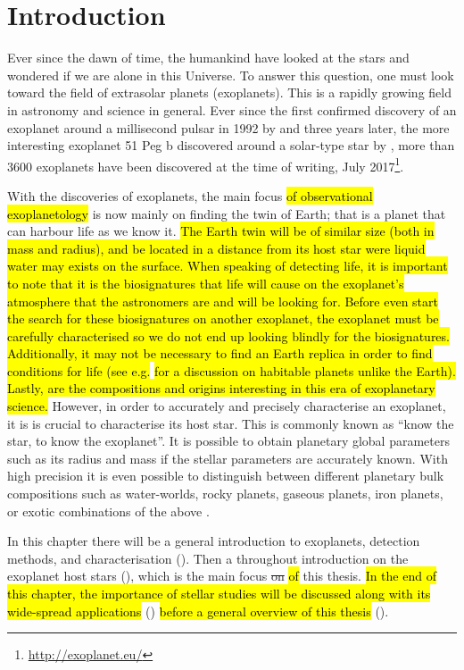 \chapter{Introduction}
\label{cha:introduction}

Ever since the dawn of time, the humankind have looked at the stars and wondered if we are alone in
this Universe. To answer this question, one must look toward the field of extrasolar planets
(exoplanets). This is a rapidly growing field in astronomy and science in general. Ever since the
first confirmed discovery of an exoplanet around a millisecond pulsar in 1992 by
\citet{Wolszczan1992} and three years later, the more interesting exoplanet 51 Peg b discovered
around a solar-type star by \citet{Mayor1995}, more than 3600 exoplanets have been discovered at the
time of writing, July 2017\footnote{\url{http://exoplanet.eu/}}.

With the discoveries of exoplanets, the main focus \hl{of observational exoplanetology} is now
mainly on finding the twin of Earth; that is a planet that can harbour life as we know it. \hl{The
Earth twin will be of similar size (both in mass and radius), and be located in a distance from its
host star were liquid water may exists on the surface. When speaking of detecting life, it is
important to note that it is the biosignatures that life will cause on the exoplanet's atmosphere
that the astronomers are and will be looking for. Before even start the search for these
biosignatures on another exoplanet, the exoplanet must be carefully characterised so we do not end
up looking blindly for the biosignatures. Additionally, it may not be necessary to find an Earth
replica in order to find conditions for life (see e.g.} \citet{Alibert2014} \hl{for a discussion on
habitable planets unlike the Earth). Lastly, are the compositions and origins interesting in this
era of exoplanetary science.} However, in order to accurately and precisely characterise an
exoplanet, it is is crucial to characterise its host star. This is commonly known as ``know the
star, to know the exoplanet''. It is possible to obtain planetary global parameters such as its
radius and mass if the stellar parameters are accurately known. With high precision it is even
possible to distinguish between different planetary bulk compositions such as water-worlds, rocky
planets, gaseous planets, iron planets, or exotic combinations of the above \citep[see
e.g.][]{Dorn2015,Thiabaud2014}.

In this chapter there will be a general introduction to exoplanets, detection methods, and
characterisation (). Then a throughout introduction on the exoplanet host stars
(), which is the main focus \st{on} \hl{of} this thesis. \hl{In the end
of this chapter, the importance of stellar studies will be discussed along with its wide-spread
applications} () \hl{before a general overview of this thesis}
().



